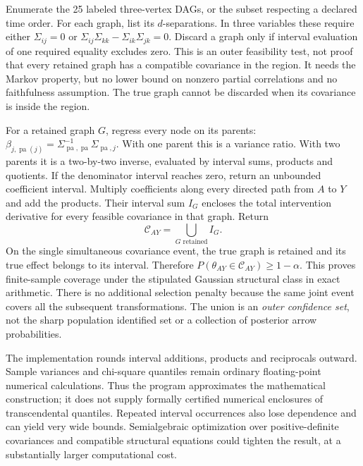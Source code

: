Enumerate the 25 labeled three-vertex DAGs, or the subset respecting a
declared time order. For each graph, list its $d$-separations. In three
variables these require either $\Sigma_{ij}=0$ or
$\Sigma_{ij}\Sigma_{kk}-\Sigma_{ik}\Sigma_{jk}=0$. Discard a graph
only if interval evaluation of one required equality excludes zero.
This is an outer feasibility test, not proof that every retained graph
has a compatible covariance in the region. It needs the Markov property,
but no lower bound on nonzero partial correlations and no faithfulness
assumption. The true graph cannot be discarded when its covariance is
inside the region.

For a retained graph $G$, regress every node on its parents:
$\beta_{j,\operatorname{pa}(j)}=
\Sigma_{\operatorname{pa},\operatorname{pa}}^{-1}
\Sigma_{\operatorname{pa},j}$. With one parent this is a variance ratio.
With two parents it is a two-by-two inverse, evaluated by interval sums,
products and quotients. If the denominator interval reaches zero, return
an unbounded coefficient interval. Multiply coefficients along every
directed path from $A$ to $Y$ and add the products. Their interval sum
$I_G$ encloses the total intervention derivative for every feasible
covariance in that graph. Return
\begin{equation}
 \mathcal C_{AY}=\bigcup_{G\text{ retained}}I_G.
 \label{s4:graph-effect-set}
\end{equation}
On the single simultaneous covariance event, the true graph is retained
and its true effect belongs to its interval. Therefore
$P(\theta_{AY}\in\mathcal C_{AY})\ge1-\alpha$. This proves finite-sample
coverage under the stipulated Gaussian structural class in exact
arithmetic. There is no additional selection penalty because the same
joint event covers all the subsequent transformations. The union is an
\emph{outer confidence set}, not the sharp population identified set or
a collection of posterior arrow probabilities.

The implementation rounds interval additions, products and reciprocals
outward. Sample variances and chi-square quantiles remain ordinary
floating-point numerical calculations. Thus the program approximates the
mathematical construction; it does not supply formally certified numerical
enclosures of transcendental quantiles. Repeated interval occurrences also
lose dependence and can yield very wide bounds. Semialgebraic optimization
over positive-definite covariances and compatible structural equations
could tighten the result, at a substantially larger computational cost.

